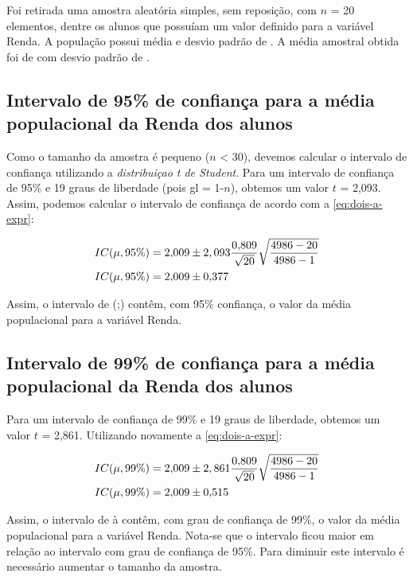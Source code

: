 

Foi retirada uma amostra aleatória simples, sem reposição, com $n$ = 20 elementos,
dentre os \TRESN alunos que possuíam um valor definido para a variável Renda.
A população possui média \TRESX e desvio padrão de \TRESSD.
A média amostral obtida foi de \TRESx com desvio padrão de \TRESsd.

\subsection{Intervalo de 95\% de confiança para a média populacional da Renda dos alunos}
Como o tamanho da amostra é pequeno ($n$ < 30), devemos calcular o intervalo
de confiança utilizando a \textit{distribuiçao t de Student}. Para um intervalo
de confiança de 95\% e 19 graus de liberdade (pois gl = 1-$n$), obtemos um valor $t$ = 2,093.
Assim, podemos calcular o intervalo de confiança de acordo com a \autoref{eq:dois-a-expr}:

\begin{align*}
	IC (\mu, 95\%) &= \num{2.009} \pm 2,093 \frac{\num{0.809}}{\sqrt{\num{20}}} \sqrt{\frac{\num{4986} - \num{20}}{\num{4986} - 1}} \\
	IC (\mu, 95\%) &= \num{2.009} \pm \num{0.377}
\end{align*}

Assim, o intervalo de (\TRESicmin;\TRESicmax) contêm, com 95\% confiança, o
valor da média populacional para a variável Renda.

\subsection{Intervalo de 99\% de confiança para a média populacional da Renda dos alunos}
Para um intervalo de confiança de 99\% e 19 graus de liberdade, obtemos um valor $t$ = 2,861.
Utilizando novamente a \autoref{eq:dois-a-expr}:

\begin{align*}
	IC (\mu, 99\%) &= \num{2.009} \pm 2,861 \frac{\num{0.809}}{\sqrt{\num{20}}} \sqrt{\frac{\num{4986} - \num{20}}{\num{4986} - 1}} \\
	IC (\mu, 99\%) &= \num{2.009} \pm \num{0.515}
\end{align*}

Assim, o intervalo de \TRESicNoveNoveMin à \TRESicNoveNoveMax contêm, com grau de confiança de 99\%, o valor
da média populacional para a variável Renda. Nota-se que o intervalo ficou maior em relação ao intervalo com grau de confiança de 95\%. 
Para diminuir este intervalo é necessário aumentar o tamanho da amostra.

